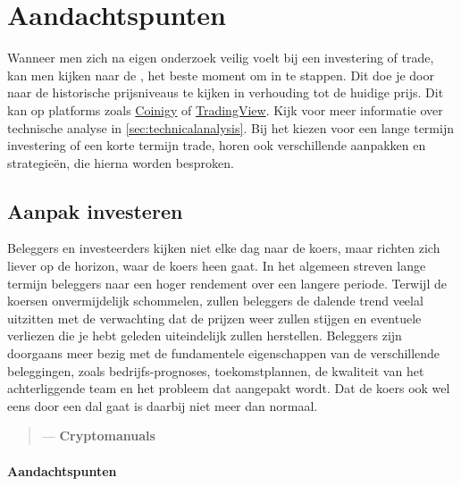     
\section{Aandachtspunten}
Wanneer men zich na eigen onderzoek veilig voelt bij een investering of trade, kan men kijken naar de , het beste moment om in te stappen. Dit doe je door naar de historische prijsniveaus te kijken in verhouding tot de huidige prijs. Dit kan op platforms zoals \href{https://www.coinigy.com/?r=17fa0d35}{Coinigy} of \href{https://www.tradingview.com/}{TradingView}. Kijk voor meer informatie over technische analyse in \cref{sec:technicalanalysis}. Bij het kiezen voor een lange termijn investering of een korte termijn trade, horen ook verschillende aanpakken en strategie\"en, die hierna worden besproken.

\subsection{Aanpak investeren}
 Beleggers en investeerders kijken niet elke dag naar de koers, maar richten zich liever op de horizon, waar de koers heen gaat.
 In het algemeen streven lange termijn beleggers naar een hoger rendement over een langere periode. Terwijl de koersen onvermijdelijk schommelen, zullen beleggers de dalende trend veelal uitzitten met de verwachting dat de prijzen weer zullen stijgen en eventuele verliezen die je hebt geleden uiteindelijk zullen herstellen. Beleggers zijn doorgaans meer bezig met de fundamentele eigenschappen van de verschillende beleggingen, zoals bedrijfs-prognoses, toekomstplannen, de kwaliteit van het achterliggende team en het probleem dat aangepakt wordt. Dat de koers ook wel eens door een dal gaat is daarbij niet meer dan normaal. 

    \begin{quotation}
        \textit{}
            \begin{flushright}
                \small{--- \textbf{Cryptomanuals}}
            \end{flushright}
    \end{quotation}

\paragraph{Aandachtspunten} 

